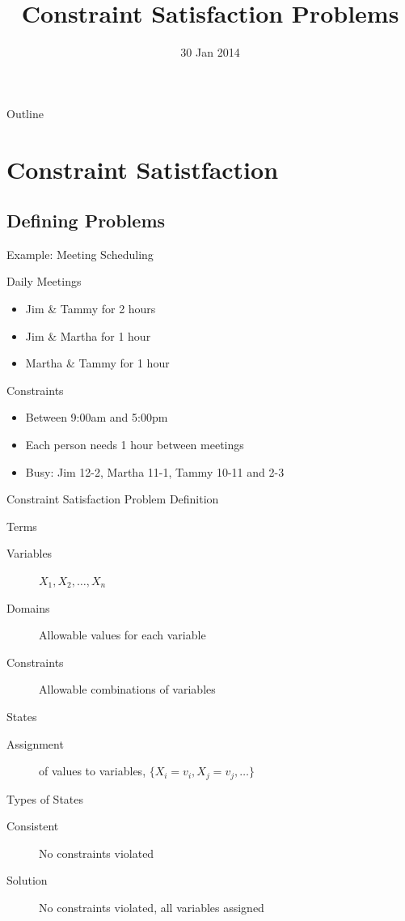 \documentclass[14pt]{beamer}
\title{Constraint Satisfaction Problems}
\date[]{30 Jan 2014}
\begin{document}
\begin{frame}
  \titlepage
\end{frame}

\begin{frame}{Outline}
  \tableofcontents
\end{frame}

\section{Constraint Satistfaction}

\subsection{Defining Problems}
\begin{frame}{Example: Meeting Scheduling}
	\begin{block}{Daily Meetings}
		\begin{itemize}
			\item Jim \& Tammy for 2 hours
			\item Jim \& Martha for 1 hour
			\item Martha \& Tammy for 1 hour
		\end{itemize}
	\end{block}
	\begin{block}{Constraints}
		\begin{itemize}
			\item Between 9:00am and 5:00pm
			\item Each person needs 1 hour between meetings
			\item Busy: Jim 12-2, Martha 11-1, Tammy 10-11 and 2-3
		\end{itemize}
	\end{block}
\end{frame}
\begin{frame}{Constraint Satisfaction Problem Definition}
	\begin{block}{Terms}
		\begin{description}
			\item[Variables] $X_1, X_2, \ldots, X_n$
			\item[Domains] Allowable values for each variable
			\item[Constraints] Allowable combinations of variables
		\end{description}
	\end{block}
	\begin{block}{States}
		\begin{description}
			\item[Assignment] of values to variables, $\{X_i=v_i, X_j=v_j, \ldots\}$
		\end{description}
	\end{block}
	\begin{block}{Types of States}
		\begin{description}
			\item[Consistent] No constraints violated
			\item[Solution] No constraints violated, all variables assigned
		\end{description}
	\end{block}
\end{frame}
\end{document}
